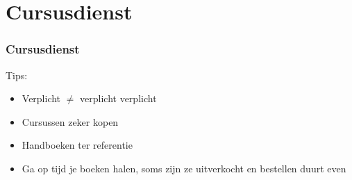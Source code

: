 \section{Cursusdienst}
\begin{frame}[allowframebreaks=10]
	\frametitle{Cursusdienst}
    \vspace{0.5cm}
    
    Tips:
    \begin{itemize}
        \item Verplicht $\neq$ verplicht verplicht
        \item Cursussen zeker kopen
        \item Handboeken ter referentie
        \item Ga op tijd je boeken halen, soms zijn ze uitverkocht en bestellen duurt even
	\end{itemize}
    


\end{frame}
